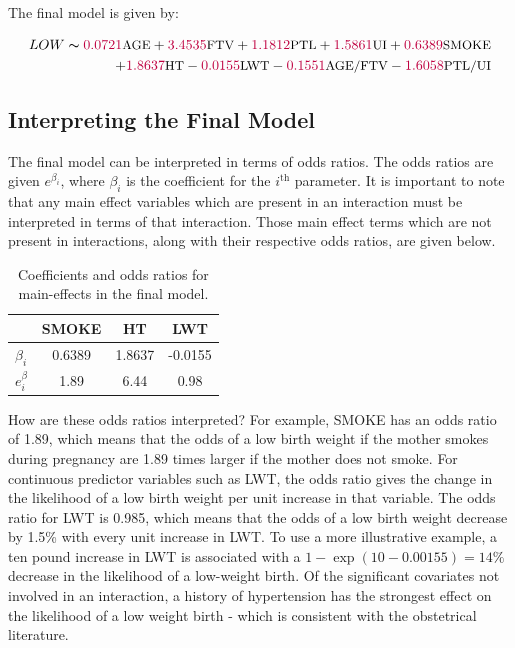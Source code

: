 The final model is given by:

\vspace{-0.5cm}
\begin{equation}
    \begin{split}
    \small{LOW\thicksim \textcolor{purple}{0.0721} \text{AGE} + \textcolor{purple}{3.4535} \text{FTV} + \textcolor{purple}{1.1812} \text{PTL} + \textcolor{purple}{1.5861} \text{UI} + \textcolor{purple}{0.6389} \text{SMOKE}} \\
    \small{+ \textcolor{purple}{1.8637} \text{HT} - \textcolor{purple}{0.0155} \text{LWT} - \textcolor{purple}{0.1551} \text{AGE/FTV} -\textcolor{purple}{1.6058} \text{PTL/UI}}
    \end{split}
\end{equation}

\subsection{Interpreting the Final Model} \label{sec:interpretation}
The final model can be interpreted in terms of odds ratios. The odds ratios are given $e^{\beta_i}$, where $\beta_i$ is the coefficient for the $i^{\text{th}}$ parameter. It is important to note that any main effect variables which are present in an interaction must be interpreted in terms of that interaction. Those main effect terms which are not present in interactions, along with their respective odds ratios, are given below.

\renewcommand\arraystretch{1.2}
\begin{table}[ht]
    \centering
    \begin{tabular}[t]{lccc}
        \toprule
        & SMOKE & HT & LWT \\
        \midrule
        $\beta_i$ & 0.6389 & 1.8637 & -0.0155 \\
        $e^\beta_i$ & 1.89 & 6.44 & 0.98 \\
        \bottomrule
    \end{tabular}
    \caption{Coefficients and odds ratios for main-effects in the final model.}
    \label{tab:main-effect-odds}
\end{table}%

How are these odds ratios interpreted? For example, SMOKE has an odds ratio of 1.89, which means that the odds of a low birth weight if the mother smokes during pregnancy are 1.89 times larger if the mother does not smoke. For continuous predictor variables such as LWT, the odds ratio gives the change in the likelihood of a low birth weight per unit increase in that variable. The odds ratio for LWT is 0.985, which means that the odds of a low birth weight decrease by 1.5\% with every unit increase in LWT. To use a more illustrative example, a ten pound increase in LWT is associated with a $1-\exp(10-0.00155) = 14\%$ decrease in the likelihood of a low-weight birth. Of the significant covariates not involved in an interaction, a history of hypertension has the strongest effect on the likelihood of a low weight birth - which is consistent with the obstetrical literature.

